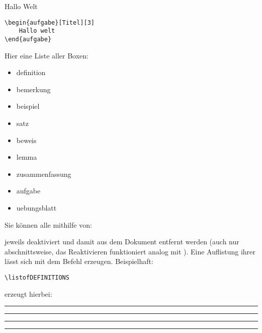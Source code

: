 \begin{aufgabe}[Titel][3]
    Hallo Welt
\begin{lstlisting}[language=lLatex]
\begin{aufgabe}[Titel][3]
    Hallo welt
\end{aufgabe}\end{lstlisting}
\end{aufgabe}
Hier eine Liste aller Boxen:
\begin{multicols}{3}
    \begin{itemize}[label=$\diamond$]\narrowitems
        \item definition
        \item bemerkung
        \item beispiel
        \item satz
        \item beweis
        \item lemma
        \item zusammenfassung
        \item aufgabe
        \item uebungsblatt
    \end{itemize}
\end{multicols}
Sie können alle mithilfe von:
\begin{latex}
\end{latex}
jeweils deaktiviert und damit aus dem Dokument entfernt werden (auch nur abschnittsweise, das Reaktivieren funktioniert analog mit ). \newline
Eine Auflistung ihrer lässt sich mit dem  Befehl erzeugen. Beispielhaft:
\begin{lstlisting}[language=lLatex]
\listofDEFINITIONS
\end{lstlisting}
erzeugt hierbei:\\
\rule{\linewidth}{1.2pt}\vspace{-0.75\baselineskip}
\rule{\linewidth}{0.6pt}\vspace*{-1.5cm}
\listofDEFINITIONS
\rule{\linewidth}{0.6pt}\vspace{-0.7\baselineskip}
\rule{\linewidth}{1.2pt}

